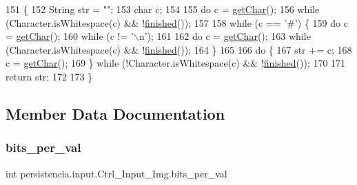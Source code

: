 \begin{DoxyCode}
151                              \{
152         String str = \textcolor{stringliteral}{""};
153         \textcolor{keywordtype}{char} c;
154 
155         \textcolor{keywordflow}{do} c = \hyperlink{classpersistencia_1_1input_1_1Ctrl__Input__Img_a85a204b05c118b07d403e9b59d7f18c0}{getChar}(); 
156         \textcolor{keywordflow}{while} (Character.isWhitespace(c) && !\hyperlink{classpersistencia_1_1input_1_1Ctrl__Input_a5a94d207dce0fd592b5ac17f55154d4f}{finished}());
157 
158         \textcolor{keywordflow}{while} (c == \textcolor{charliteral}{'#'}) \{
159             \textcolor{keywordflow}{do} c = \hyperlink{classpersistencia_1_1input_1_1Ctrl__Input__Img_a85a204b05c118b07d403e9b59d7f18c0}{getChar}();
160             \textcolor{keywordflow}{while} (c != \textcolor{charliteral}{'\(\backslash\)n'});
161 
162             \textcolor{keywordflow}{do} c = \hyperlink{classpersistencia_1_1input_1_1Ctrl__Input__Img_a85a204b05c118b07d403e9b59d7f18c0}{getChar}(); 
163             \textcolor{keywordflow}{while} (Character.isWhitespace(c) && !\hyperlink{classpersistencia_1_1input_1_1Ctrl__Input_a5a94d207dce0fd592b5ac17f55154d4f}{finished}());
164         \}
165         
166         \textcolor{keywordflow}{do} \{
167             str += c;
168             c = \hyperlink{classpersistencia_1_1input_1_1Ctrl__Input__Img_a85a204b05c118b07d403e9b59d7f18c0}{getChar}();
169         \} \textcolor{keywordflow}{while} (!Character.isWhitespace(c) && !\hyperlink{classpersistencia_1_1input_1_1Ctrl__Input_a5a94d207dce0fd592b5ac17f55154d4f}{finished}());
170 
171         \textcolor{keywordflow}{return} str;
172         
173     \}
\end{DoxyCode}


\subsection{Member Data Documentation}
\mbox{\label{classpersistencia_1_1input_1_1Ctrl__Input__Img_a222ad0e7d241e5f396cf67c3b760f143}} 
\subsubsection{\texorpdfstring{bits\+\_\+per\+\_\+val}{bits\_per\_val}}
{\footnotesize\ttfamily int persistencia.\+input.\+Ctrl\+\_\+\+Input\+\_\+\+Img.\+bits\+\_\+per\+\_\+val\hspace{0.3cm}{\ttfamily [package]}}


